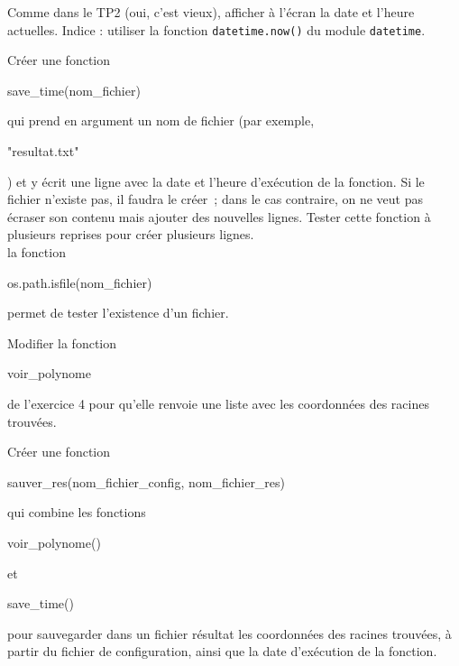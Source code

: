 \begin{correction}

\end{correction}

\pagebreak
\exo

\begin{enonce}
	[Stockage de résultat]

	\quessques Comme dans le TP2 (oui, c'est vieux), afficher à l'écran la date et l'heure actuelles.
	Indice : utiliser la fonction \texttt{datetime.now()} du module \texttt{datetime}.

	\ssques Créer une fonction \begin{texttt}save\_time(nom\_fichier)\end{texttt} qui prend en argument un nom de fichier (par exemple, \begin{texttt}"resultat.txt"\end{texttt}) et y écrit une ligne avec la date et l'heure d'exécution de la fonction.
	Si le fichier n'existe pas, il faudra le créer ; dans le cas contraire, on ne veut pas écraser son contenu mais ajouter des nouvelles lignes.
	Tester cette fonction à plusieurs reprises pour créer plusieurs lignes.\\

	\indic la fonction \begin{texttt}os.path.isfile(nom\_fichier)\end{texttt} permet de tester l'existence d'un fichier.

	\quessques Modifier la fonction \begin{texttt}voir\_polynome\end{texttt} de l'exercice 4 pour qu'elle renvoie une liste avec les coordonnées des racines trouvées.

	\ssques Créer une fonction \begin{texttt}sauver\_res(nom\_fichier\_config, nom\_fichier\_res)\end{texttt} qui combine les fonctions \begin{texttt}voir\_polynome()\end{texttt} et \begin{texttt}save\_time()\end{texttt} pour sauvegarder dans un fichier résultat les coordonnées des racines trouvées, à partir du fichier de configuration, ainsi que la date d'exécution de la fonction.



\end{enonce}

\begin{correction}

\end{correction}
